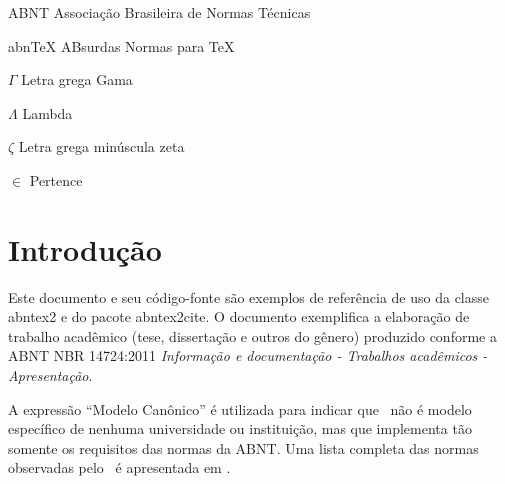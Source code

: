 \documentclass[
	12pt,				%
	openright,			%
	oneside,			%
	a4paper,			%
	english,			%
	french,				%
	spanish,			%
	brazil				%
	]{abntex2}
\begin{document}
\listoffigures*
\cleardoublepage

\listoftables*
\cleardoublepage

\begin{siglas}
  \item[ABNT] Associação Brasileira de Normas Técnicas
  \item[abnTeX] ABsurdas Normas para TeX
\end{siglas}

\begin{simbolos}
  \item[$ \Gamma $] Letra grega Gama
  \item[$ \Lambda $] Lambda
  \item[$ \zeta $] Letra grega minúscula zeta
  \item[$ \in $] Pertence
\end{simbolos}

\tableofcontents*
\cleardoublepage

\textual

\chapter*[Introdução]{Introdução}

Este documento e seu código-fonte são exemplos de referência de uso da classe
\textsf{abntex2} e do pacote \textsf{abntex2cite}. O documento 
exemplifica a elaboração de trabalho acadêmico (tese, dissertação e outros do
gênero) produzido conforme a ABNT NBR 14724:2011 \emph{Informação e documentação
- Trabalhos acadêmicos - Apresentação}.

A expressão ``Modelo Canônico'' é utilizada para indicar que \abnTeX\ não é
modelo específico de nenhuma universidade ou instituição, mas que implementa tão
somente os requisitos das normas da ABNT. Uma lista completa das normas
observadas pelo \abnTeX\ é apresentada em .
\end{document}
